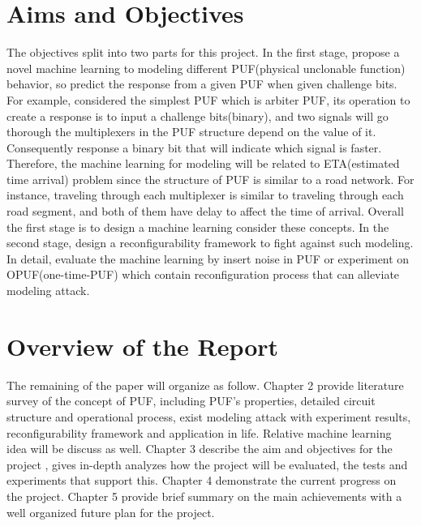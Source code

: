 \section{Aims and Objectives}
The objectives split into two parts for this project. In the first stage, propose a novel machine learning to modeling different PUF(physical unclonable function)
behavior, so predict the response from a given PUF when given challenge bits. For example, considered the simplest PUF which is arbiter PUF, its operation to create a response is to
input a challenge bits(binary), and two signals will go thorough the multiplexers in the PUF structure depend on the value of it. Consequently response a binary bit
that will indicate which signal is faster. Therefore, the machine learning for modeling will be related to ETA(estimated time arrival) problem since the structure of PUF is similar to a road network. 
For instance, traveling through each multiplexer is similar to traveling through each road segment, and both of them have delay to affect the time of arrival. Overall the first stage is to design a machine learning
consider these concepts. In the second stage, design a reconfigurability framework to fight against such modeling. In detail, evaluate the machine learning by insert noise in PUF or experiment on OPUF(one-time-PUF) which
contain reconfiguration process that can alleviate modeling attack.

\section{Overview of the Report}
The remaining of the paper will organize as follow. Chapter 2 provide literature survey of the concept of PUF, including PUF's properties, detailed circuit structure and operational process, 
exist modeling attack with experiment results, reconfigurability framework and application in life. Relative machine learning idea will be discuss as well. Chapter 3 describe the aim and objectives for the project
, gives in-depth analyzes how the project will be evaluated, the tests and experiments that support this. Chapter 4 demonstrate the current progress on the project. Chapter 5 provide brief
summary on the main achievements with a well organized future plan for the project.
